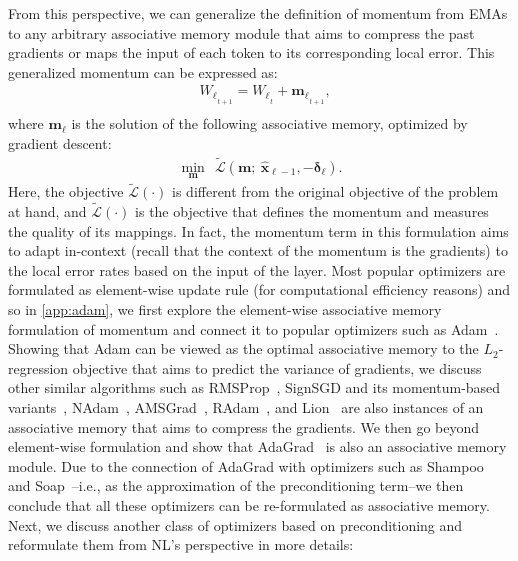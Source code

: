 \documentclass{article}
\newcommand{\citep}{\parencite}
\begin{document}
From this perspective, we can generalize the definition of momentum from EMAs to any arbitrary associative memory module that aims to compress the past gradients or maps the input of each token to its corresponding local error. This generalized momentum can be expressed as:
\begin{align}
    &{W_{\ell}}_{_{t+1}} = {W_{\ell}}_{_{t}} + {\boldsymbol{m}_{\ell}}_{_{t+1}}, \\
\end{align}
where $\boldsymbol{m}_{\ell}$ is the solution of the following associative memory, optimized by gradient descent:
\begin{align}
    \min_{\boldsymbol{m}}\:\: \tilde{\mathcal{L}}\left(\boldsymbol{m};  \:\hat{\boldsymbol{x}}_{\ell - 1}, - \boldsymbol{\delta}_{\ell} \right).
\end{align}
Here, the objective $\tilde{\mathcal{L}}(\cdot)$ is different from the original objective of the problem at hand, and $\tilde{\mathcal{L}}(\cdot)$ is the objective that defines the momentum and measures the quality of its mappings. In fact, the momentum term in this formulation aims to adapt in-context (recall that the context of the momentum is the gradients) to the local error rates based on the input of the layer. Most popular optimizers are formulated as element-wise update rule (for computational efficiency reasons) and so in \autoref{app:adam}, we first explore the element-wise associative memory formulation of momentum and connect it to popular optimizers such as Adam~\citep{kingma2014adam}. Showing that Adam can be viewed as the optimal associative memory to the $L_2$-regression objective that aims to predict the variance of gradients, we discuss other similar algorithms such as RMSProp~\citep{hinton2012neural}, SignSGD and its momentum-based variants~\citep{bernstein2018signsgd}, NAdam~\citep{dozat2016incorporating}, AMSGrad~\citep{reddi2016stochastic}, RAdam~\citep{Liu2020On}, and Lion~\citep{chen2023symbolic} are also instances of an associative memory that aims to compress the gradients. We then go beyond element-wise formulation and show that AdaGrad~\citep{duchi2011adaptive} is also an associative memory module. Due to the connection of AdaGrad with optimizers such as Shampoo~\citep{gupta2018shampoo} and Soap~\citep{vyas2025soap}–i.e., as the approximation of the preconditioning term–we then conclude that all these optimizers can be re-formulated as associative memory. Next, we discuss another class of optimizers based on preconditioning and reformulate them from NL's perspective in more details:
\end{document}
